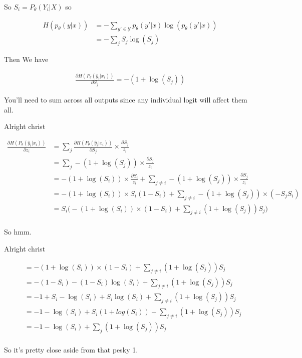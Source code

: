 \documentclass{article}
\begin{document}
		So $S_i = P_\theta(Y_i|X)$ so 
		
		\begin{align}
			H(p_\theta(y|x)) &= -\sum_{y'\in\mathcal{Y}} p_\theta(y'|x)\log(p_\theta(y'|x))\\
			&= -\sum_{j} S_j\log(S_j)
		\end{align}
		
		Then We have
		
		\begin{align}
			\frac{\partial H(P_\theta(\hat{y}_i|x_i))}{\partial S_j} = -(1+\log(S_j))
		\end{align}
		
		You'll need to sum across all outputs since any individual logit will affect them all.
		
		Alright christ
		
		\begin{align}
			\frac{\partial H(P_\theta(\hat{y}_i|x_i))}{\partial z_i} &= \sum_j \frac{\partial H(P_\theta(\hat{y}_i|x_i))}{\partial S_j}\times \frac{\partial S_j}{z_i}\\
			&= \sum_j -(1+\log(S_j))\times \frac{\partial S_j}{z_i}\\
			&= -(1+\log(S_i))\times \frac{\partial S_i}{z_i} + \sum_{j\neq i} -(1+\log(S_j))\times \frac{\partial S_j}{z_i}	\\
			&= -(1+\log(S_i))\times S_i(1-S_i) + \sum_{j\neq i} -(1+\log(S_j))\times (-S_jS_i)\\
			&= S_i\big(-(1+\log(S_i))\times (1-S_i) + \sum_{j\neq i} (1+\log(S_j))S_j\big)\\
		\end{align}
		
		So hmm.

		Alright christ
		
		\begin{align}
			&= -(1+\log(S_i))\times (1-S_i) + \sum_{j\neq i} (1+\log(S_j))S_j\\
			&= -(1-S_i) - (1-S_i)\log(S_i) + \sum_{j\neq i} (1+\log(S_j))S_j\\
			&= -1+S_i - \log(S_i) + S_i\log(S_i) + \sum_{j\neq i} (1+\log(S_j))S_j\\
			&= -1 - \log(S_i) + S_i(1+log(S_i)) + \sum_{j\neq i} (1+\log(S_j))S_j\\
			&= -1 - \log(S_i)  + \sum_{j} (1+\log(S_j))S_j\\
		\end{align}
		
		So it's pretty close aside from that pesky 1.
		
\end{document}
